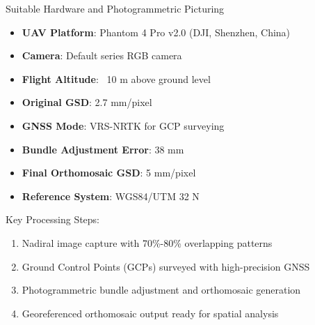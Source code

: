 \documentclass[aspectratio=43]{beamer}
\begin{document}
\begin{frame}
    \begin{block}{\small Suitable Hardware and Photogrammetric Picturing}
        \small
        \begin{itemize}
            \item \textbf{UAV Platform}: Phantom 4 Pro v2.0 (DJI, Shenzhen, China)
            \item \textbf{Camera}: Default series RGB camera
            \item \textbf{Flight Altitude}: ~10 m above ground level
            \item \textbf{Original GSD}: 2.7 mm/pixel
            \item \textbf{GNSS Mode}: VRS-NRTK for GCP surveying
            \item \textbf{Bundle Adjustment Error}: 38 mm
            \item \textbf{Final Orthomosaic GSD}: 5 mm/pixel
            \item \textbf{Reference System}: WGS84/UTM 32 N
        \end{itemize}
    \end{block}
    
    \begin{block}{\small Key Processing Steps:}
        \small
        \begin{enumerate}
            \item Nadiral image capture with 70\%-80\% overlapping patterns
            \item Ground Control Points (GCPs) surveyed with high-precision GNSS
            \item Photogrammetric bundle adjustment and orthomosaic generation
            \item Georeferenced orthomosaic output ready for spatial analysis
        \end{enumerate}
    \end{block}
\end{frame}
\end{document}
